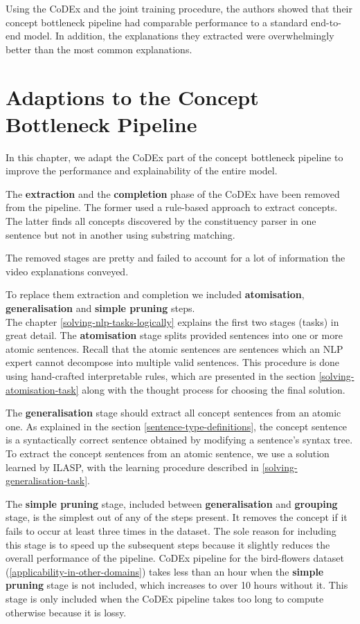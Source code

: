 Using the CoDEx and the joint training procedure, the authors showed that their concept bottleneck pipeline had comparable performance to a standard end-to-end model.
In addition, the explanations they extracted were overwhelmingly better than the most common explanations.

\section{Adaptions to the Concept Bottleneck Pipeline}

In this chapter, we adapt the CoDEx part of the concept bottleneck pipeline to improve the performance and explainability of the entire model.

The \textbf{extraction} and the \textbf{completion} phase of the CoDEx have been removed from the pipeline.
The former used a rule-based approach to extract concepts.
The latter finds all concepts discovered by the constituency parser in one sentence but not in another using substring matching.

The removed stages are pretty and failed to account for a lot of information the video explanations conveyed.

To replace them extraction and completion we included \textbf{atomisation}, \textbf{generalisation} and \textbf{simple pruning} steps. \\
The chapter \ref{solving-nlp-tasks-logically} explains the first two stages (tasks) in great detail.
The \textbf{atomisation} stage splits provided sentences into one or more atomic sentences. 
Recall that the atomic sentences are sentences which an NLP expert cannot decompose into multiple valid sentences.
This procedure is done using hand-crafted interpretable rules, which are presented in the section \ref{solving-atomisation-task} along with the thought process for choosing the final solution.

The \textbf{generalisation} stage should extract all concept sentences from an atomic one. 
As explained in the section \ref{sentence-type-definitions}, the concept sentence is a syntactically correct sentence obtained by modifying a sentence's syntax tree.
To extract the concept sentences from an atomic sentence, we use a solution learned by ILASP, with the learning procedure described in \ref{solving-generalisation-task}.

The \textbf{simple pruning} stage, included between \textbf{generalisation} and \textbf{grouping} stage, is the simplest out of any of the steps present. 
It removes the concept if it fails to occur at least three times in the dataset.
The sole reason for including this stage is to speed up the subsequent steps because it slightly reduces the overall performance of the pipeline.
CoDEx pipeline for the bird-flowers dataset (\ref{applicability-in-other-domains}) takes less than an hour when the \textbf{simple pruning} stage is not included, which increases to over 10 hours without it.
This stage is only included when the CoDEx pipeline takes too long to compute otherwise because it is lossy.

